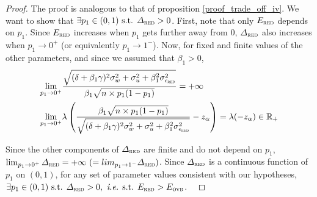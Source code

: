 \documentclass[a4paper, 11pt]{report}
\begin{document}
\begin{proof}
                                		The proof is analogous to that of proposition \ref{proof_trade_off_iv}. We want to show that $\exists p_{1} \in (0,1) \text{ s.t. } \varDelta_{\textsc{red}} > 0$. First, note that only $E_{\textsc{red}}$ depends on $p_{1}$. Since $E_{\textsc{red}}$ increases when $p_{1}$ gets further away from 0, $\varDelta_{\textsc{red}}$ also increases when $p_{1} \to 0^{+}$ (or equivalently $p_{1} \to 1^{-}$). Now, for fixed and finite values of the other parameters, and since we assumed that $\beta_{1} > 0$,
                                		~
                                		\begin{align*}
                                			\lim_{p_{1} \to 0^{+}} & \dfrac{\sqrt{(\delta + \beta_{1}\gamma)^{2} \sigma_{w}^{2} + \sigma_{u}^{2} + \beta_{1}^{2} \sigma_{\epsilon_{\textsc{red}}}^{2}}}{\beta_{1}\sqrt{n \times p_{1}(1-p_{1})}} = + \infty \\
                                			\lim_{p_{1} \to 0^{+}} & \lambda \left( \dfrac{\beta_{1}\sqrt{n \times p_{1}(1-p_{1})}}{\sqrt{(\delta + \beta_{1}\gamma)^{2} \sigma_{w}^{2} + \sigma_{u}^{2} + \beta_{1}^{2} \sigma_{\epsilon_{\textsc{red}}}^{2}}} - z_{\alpha} \right) = \lambda (- z_{\alpha}) \in \mathbb{R}_{+}
                                		\end{align*}
                                			
                                		Since the other components of $\varDelta_{\textsc{red}}$ are finite and do not depend on $p_{1}$, $\lim_{p_{1} \to 0^{+}} \varDelta_{\textsc{red}} = + \infty \ (= lim_{p_{1} \to 1^{-}} \varDelta_{\textsc{red}} )$. Since $\varDelta_{\textsc{red}}$ is a continuous function of $p_{1}$ on $(0, 1)$, for any set of parameter values consistent with our hypotheses, $\exists p_{1} \in (0, 1) \text{ s.t. } \varDelta_{\textsc{red}} > 0, \text{ \textit{i.e.} s.t. }E_{\textsc{red}} > E_{\textsc{ovb}}$. 
            			~
            			\end{proof}
                    		
                    		
    		
    						
    				
	

	
	
	
	
	
	
	
		
\end{document}

